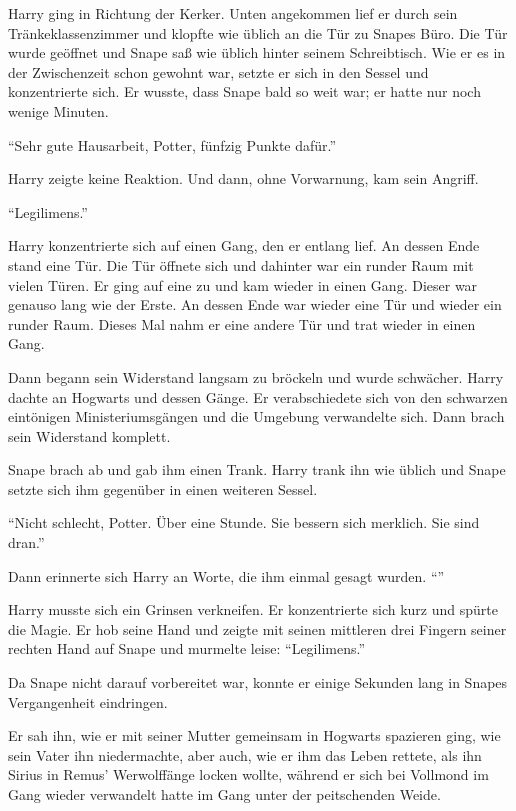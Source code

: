 \trenn

Harry ging in Richtung der Kerker. Unten angekommen lief er durch sein Tränkeklassenzimmer und klopfte wie üblich an die Tür zu Snapes Büro. Die Tür wurde geöffnet und Snape saß wie üblich hinter seinem Schreibtisch. Wie er es in der Zwischenzeit schon gewohnt war, setzte er sich in den Sessel und konzentrierte sich. Er wusste, dass Snape bald so weit war; er hatte nur noch wenige Minuten.

\enquote{Sehr gute Hausarbeit, Potter, fünfzig Punkte dafür.}

Harry zeigte keine Reaktion. Und dann, ohne Vorwarnung, kam sein Angriff.

\enquote{Legilimens.}

Harry konzentrierte sich auf einen Gang, den er entlang lief. An dessen Ende stand eine Tür. Die Tür öffnete sich und dahinter war ein runder Raum mit vielen Türen. Er ging auf eine zu und kam wieder in einen Gang. Dieser war genauso lang wie der Erste. An dessen Ende war wieder eine Tür und wieder ein runder Raum. Dieses Mal nahm er eine andere Tür und trat wieder in einen Gang.

Dann begann sein Widerstand langsam zu bröckeln und wurde schwächer. Harry dachte an Hogwarts und dessen Gänge. Er verabschiedete sich von den schwarzen eintönigen Ministeriumsgängen und die Umgebung verwandelte sich. Dann brach sein Widerstand komplett.

Snape brach ab und gab ihm einen Trank. Harry trank ihn wie üblich und Snape setzte sich ihm gegenüber in einen weiteren Sessel.

\enquote{Nicht schlecht, Potter. Über eine Stunde. Sie bessern sich merklich. Sie sind dran.}

Dann erinnerte sich Harry an Worte, die ihm einmal gesagt wurden. \enquote{}

Harry musste sich ein Grinsen verkneifen. Er konzentrierte sich kurz und spürte die Magie. Er hob seine Hand und zeigte mit seinen mittleren drei Fingern seiner rechten Hand auf Snape und murmelte leise: \enquote{Legilimens.}

Da Snape nicht darauf vorbereitet war, konnte er einige Sekunden lang in Snapes Vergangenheit eindringen.

\begin{traum}
Er sah ihn, wie er mit seiner Mutter gemeinsam in Hogwarts spazieren ging, wie sein Vater ihn niedermachte, aber auch, wie er ihm das Leben rettete, als ihn Sirius in Remus' Werwolffänge locken wollte, während er sich bei Vollmond im Gang wieder verwandelt hatte \gst im Gang unter der peitschenden Weide.
\end{traum}

